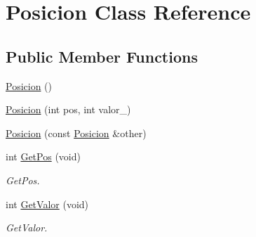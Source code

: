 \hypertarget{class_posicion}{\section{Posicion Class Reference}
\label{class_posicion}
}
\subsection*{Public Member Functions}
\begin{DoxyCompactItemize}
\item 
\hyperlink{class_posicion_a8d8e3f8286029269c1c19a16c9bd87a5}{Posicion} ()
\item 
\hyperlink{class_posicion_a3a8acc2d5143228949061c773bdb65ec}{Posicion} (int pos, int valor\-\_\-)
\item 
\hyperlink{class_posicion_a192f73b6db15f6c5deeda2445aabeaff}{Posicion} (const \hyperlink{class_posicion}{Posicion} \&other)
\item 
int \hyperlink{class_posicion_a008182c63bfd089f40e793fcb3934570}{Get\-Pos} (void)
\begin{DoxyCompactList}\small\item\em Get\-Pos. \end{DoxyCompactList}\item 
int \hyperlink{class_posicion_afab01c8088eb7f72b28284c5b7b63398}{Get\-Valor} (void)
\begin{DoxyCompactList}\small\item\em Get\-Valor. \end{DoxyCompactList}\end{DoxyCompactItemize}


